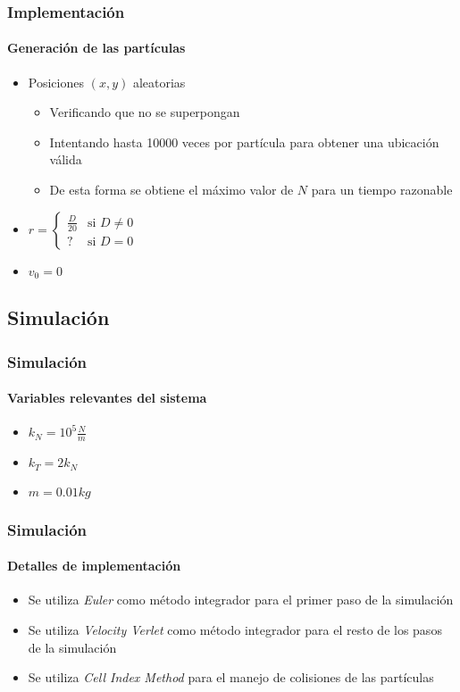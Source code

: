 \documentclass[hyperref={pdfpagelayout=SinglePage}]{beamer}
\begin{document}
\begin{frame}
\frametitle{Implementación}
\framesubtitle{Generación de las partículas}
\begin{itemize}
	\item Posiciones $(x,y)$ aleatorias
	\begin{itemize}
		\item Verificando que no se superpongan
		\item Intentando hasta 10000 veces por partícula para obtener una ubicación válida 
		\item De esta forma se obtiene el máximo valor de $N$ para un tiempo razonable
	\end{itemize}
	\item $r = \begin{cases} \frac{D}{20} & \mbox{si } D \neq 0 \\ ? & \mbox{si } D = 0 \end{cases}$
	\item $v_{0} = 0$
\end{itemize}
\end{frame}

\subsection{Simulación}

\begin{frame}
\frametitle{Simulación}
\framesubtitle{Variables relevantes del sistema}
\begin{itemize}
	\item $k_{N} = 10^5 \frac{N}{m}$
	\item $k_{T} = 2 k_{N}$
	\item $m = 0.01 kg$
\end{itemize}
\end{frame}

\begin{frame}
\frametitle{Simulación}
\framesubtitle{Detalles de implementación}
\begin{itemize}
	\item Se utiliza \textit{Euler} como método integrador para el primer paso de la simulación
	\item Se utiliza \textit{Velocity Verlet} como método integrador para el resto de los pasos de la simulación
	\item Se utiliza \textit{Cell Index Method} para el manejo de colisiones de las partículas 
\end{itemize}
\end{frame}
\end{document}
